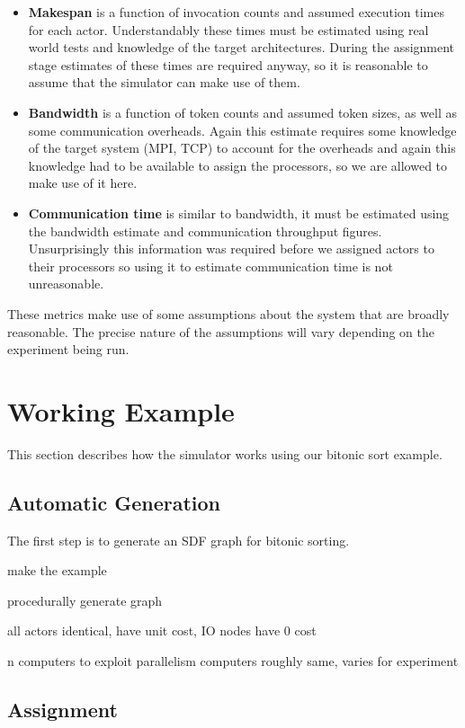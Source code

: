\begin{itemize}
	\item {\bf Makespan} is a function of invocation counts and assumed execution times for each actor.
			Understandably these times must be estimated using real world tests and knowledge of the target architectures.
			During the assignment stage estimates of these times are required anyway, so it is reasonable to assume that the simulator can make use of them.
	\item {\bf Bandwidth} is a function of token counts and assumed token sizes, as well as some communication overheads.
			Again this estimate requires some knowledge of the target system (MPI, TCP) to account for the overheads and again this knowledge had to be available to assign the processors, so we are allowed to make use of it here.
	\item {\bf Communication time} is similar to bandwidth, it must be estimated using the bandwidth estimate and communication throughput figures.
			Unsurprisingly this information was required before we assigned actors to their processors so using it to estimate communication time is not unreasonable.
\end{itemize}

These metrics make use of some assumptions about the system that are broadly reasonable.
The precise nature of the assumptions will vary depending on the experiment being run.

\section{Working Example}

This section describes how the simulator works using our bitonic sort example.

\subsection{Automatic Generation}

The first step is to generate an SDF graph for bitonic sorting.


make the example

procedurally generate graph

all actors identical, have unit cost, IO nodes have 0 cost

n computers to exploit parallelism
computers roughly same, varies for experiment

\subsection{Assignment}

